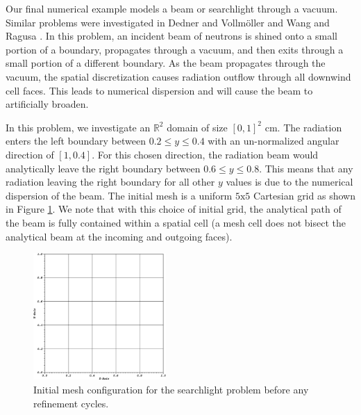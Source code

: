 Our final numerical example models a beam or searchlight through a vacuum. Similar problems were investigated in Dedner and Vollm{\"o}ller \cite{dedner2002adaptive} and Wang and Ragusa \cite{wang2011standard}. In this problem, an incident beam of neutrons is shined onto a small portion of a boundary, propagates through a vacuum, and then exits through a small portion of a different boundary. As the beam propagates through the vacuum, the spatial discretization causes radiation outflow through all downwind cell faces. This leads to numerical dispersion and will cause the beam to artificially broaden.

In this problem, we investigate an $\mathbb{R}^2$ domain of size $[0,1]^2$ cm. The radiation enters the left boundary between $0.2 \leq y \leq 0.4$ with an un-normalized angular direction of $[1,0.4]$. For this chosen direction, the radiation beam would analytically leave the right boundary between $0.6 \leq y \leq 0.8$. This means that any radiation leaving the right boundary for all other $y$ values is due to the numerical dispersion of the beam. The initial mesh is a uniform $5 \text{x} 5$ Cartesian grid as shown in Figure \ref{fig::BF_Results_SL_starting_mesh}. We note that with this choice of initial grid, the analytical path of the beam is fully contained within a spatial cell (a mesh cell does not bisect the analytical beam at the incoming and outgoing faces). 

\begin{figure}
\centering
\includegraphics[width=0.45\textwidth]{figures/sec_BF/searchlight_starting_mesh.eps}
\caption{Initial mesh configuration for the searchlight problem before any refinement cycles.}
\label{fig::BF_Results_SL_starting_mesh}
\end{figure}

